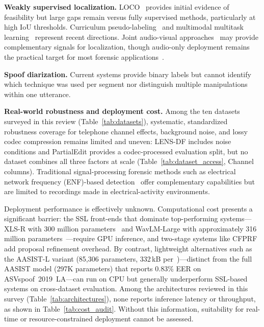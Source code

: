 \documentclass[journal]{IEEEtran}
\begin{document}
\textbf{Weakly supervised localization.} LOCO~\cite{10.24963/ijcai.2025/65} provides initial evidence of feasibility but large gaps remain versus fully supervised methods, particularly at high IoU thresholds. Curriculum pseudo-labeling~\cite{zhang2025cpl} and multimodal multitask learning~\cite{xu2025wmmt} represent recent directions. Joint audio-visual approaches~\cite{zhou2021joint,cheng2024avforgery} may provide complementary signals for localization, though audio-only deployment remains the practical target for most forensic applications~\cite{ji2024speechforensics}.

\textbf{Spoof diarization.} Current systems provide binary labels but cannot identify which technique was used per segment nor distinguish multiple manipulations within one utterance.

\textbf{Real-world robustness and deployment cost.} Among the ten datasets surveyed in this review (Table~\ref{tab:datasets}), systematic, standardized robustness coverage for telephone channel effects, background noise, and lossy codec compression remains limited and uneven: LENS-DF includes noise conditions and PartialEdit provides a codec-processed evaluation split, but no dataset combines all three factors at scale (Table~\ref{tab:dataset_access}, Channel columns). Traditional signal-processing forensic methods such as electrical network frequency (ENF)-based detection~\cite{zhao2024atd,wang2022enfdeep} offer complementary capabilities but are limited to recordings made in electrical-activity environments.


Deployment performance is effectively unknown. Computational cost presents a significant barrier: the SSL front-ends that dominate top-performing systems---XLS-R with 300 million parameters~\cite{babu2022xlsr} and WavLM-Large with approximately 316 million parameters~\cite{chen2022wavlm}---require GPU inference, and two-stage systems like CFPRF add proposal refinement overhead. By contrast, lightweight alternatives such as the AASIST-L variant (85,306 parameters, 332\,kB per~\cite{jung2022aasist})---distinct from the full AASIST model (297K parameters) that reports 0.83\% EER on ASVspoof~2019~LA---can run on CPU but generally underperform SSL-based systems on cross-dataset evaluation. Among the architectures reviewed in this survey (Table~\ref{tab:architectures}), none reports inference latency or throughput, as shown in Table~\ref{tab:cost_audit}. Without this information, suitability for real-time or resource-constrained deployment cannot be assessed.
\end{document}
